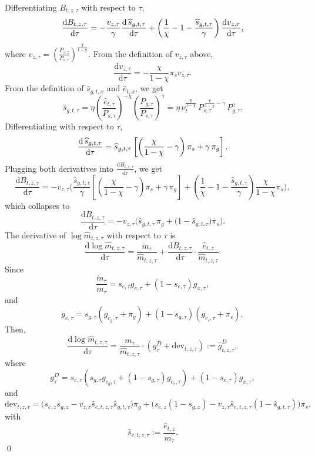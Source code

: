 \documentclass[12pt,a4paper]{article}
\def\equiv{:=}  %
\begin{document}
\begin{appendices}
\noindent Differentiating $B_{t,z,\tau}$ with respect to $\tau$, 
\[
\frac{\text{d} B_{t,z,\tau}}{\text{d}\tau}
= - 
\frac{ v_{z,\tau}}{\gamma}  \frac{\text{\text{\text{d}}}\,\widehat{s}_{g,t,\tau}}{\text{d}\tau} 
+ \left( \frac{1}{\chi} - 1 - \frac{\widehat{s}_{g,t,\tau}}{\gamma} \right)  \frac{\text{d} v_{z,\tau}}{\text{d}\tau}  ,
\]
where $v_{z,\tau} =  \left( \frac{P_{s,z}}{P_{s,\tau}} \right)^{\frac{\chi}{1 - \chi}}  $.
From the definition of $v_{z,\tau}$ above,
\[
\frac{\text{d} v_{z,\tau}}{\text{d}\tau} = -\frac{\chi}{1 - \chi}  \pi_s  v_{z,\tau}.
\]
From the definition of $\widehat{s}_{g,t,x}$ and \( \widehat e_{t,x}\), we get
\[
\widehat{s}_{g,t,\tau} = \eta \left( \frac{\widehat e_{t,\tau}}{P_{s,\tau}} \right)^{-\chi} \left( \frac{P_{g,\tau}}{P_{s,\tau}} \right)^\gamma = 
\eta \, \nu_t^{\frac{\chi}{1 - \chi}} \, P_{s,\tau}^{\, \frac{\chi}{1 - \chi}-\gamma} \, P_{g,\tau}^\gamma .
\]
Differentiating with respect to $\tau$, 
\[
\frac{\text{\text{d}} \, \widehat{s}_{g,t,\tau} }{\text{d}\tau}
= \widehat{s}_{g,t,\tau} \left[
\left(  \frac{\chi}{1 - \chi} - \gamma\right) \pi_s
+ \gamma \, \pi_g
\right] .
\]
Plugging both derivatives into \(\frac{\text{d} B_{t,z,\tau}}{\text{d}\tau}\), we get
\[
\frac{\text{d} B_{t,z,\tau}}{\text{d}\tau}
=  - v_{z,\tau} \Bigg(
\frac{\widehat{s}_{g,t,\tau} }{\gamma} 
 \left[
\left(  \frac{\chi}{1 - \chi} - \gamma\right) \pi_s
+ \gamma \, \pi_g
\right] 
+ \left( \frac{1}{\chi} - 1 - \frac{\widehat{s}_{g,t,\tau}}{\gamma} \right)  \frac{\chi}{1 - \chi}  \pi_s 
\Bigg) ,
\]
which collapses to
\[
\frac{\text{d} B_{t,z,\tau}}{\text{d}\tau}
=  - v_{z,\tau} \Big( \widehat{s}_{g,t,\tau} \, \pi_g +
\big( 1 -\widehat{s}_{g,t,\tau} \big)
 \pi_s
\Big) .
\]
The derivative of \(\log \widehat{m}_{t,z,\tau} \) with respect to $\tau$ is 
\[
\frac{\text{d} \log \widehat{m}_{t,z,\tau}}{\text{d}\tau} = 
\frac{\dot m_{\tau}}{\widehat{m}_{t,z,\tau}} + 
\frac{\text{d} B_{t,z,\tau}}{\text{d}\tau} \cdot\frac{\widehat e_{t,z}}{\widehat m_{t,z,\tau}} .
\]
Since
\[
\frac{\dot{m}_\tau}{m_\tau} = s_{e,\tau} g_{e,\tau} + (1 - s_{e,\tau}) g_{x,\tau},
\]
and
\[
g_{e,\tau} = s_{g,\tau} (g_{c_g,\tau} + \pi_g) + (1 - s_{g,\tau})(g_{c_s,\tau} + \pi_s),
\]
Then, 
\[
\frac{\text{d} \log \widehat{m}_{t,z,\tau}}{\text{d}\tau} = \frac{m_\tau}{\widehat m_{t,z,\tau}} \cdot \left(
g^{D}_\tau + \text{dev}_{t,z,\tau} \right) := \widehat g^{D}_{t,z,\tau},
\]
where
\[
g^D_\tau = s_{e,\tau} \left( s_{g,\tau} g_{c_g,\tau} + (1 - s_{g,\tau}) g_{c_s,\tau} \right) + (1 - s_{e,\tau}) g_{x,\tau}  ,
\]
and
\[
\text{dev}_{t,z,\tau} = \Big(s_{e,z}s_{g,z} - v_{z,\tau}\widehat s_{e,t,z,\tau} \widehat s_{g,t,\tau} \Big) \pi_g
+ \Big(s_{e,z}(1-s_{g,z} )-  v_{z,\tau} \widehat s_{e,t,z,\tau}  (1-\widehat s_{g,t,\tau}) \Big) \pi_s,
\]
with
$$\widehat{s}_{e,t,z,\tau}\equiv\frac{\widehat{e}_{t,z}}{m_{\tau}}.$$ \qed


\end{appendices}
\end{document}
